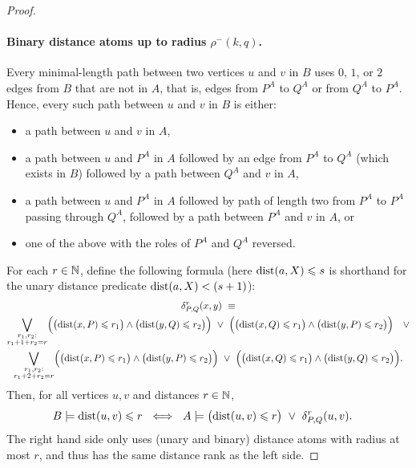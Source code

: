 \begin{proof}
    \paragraph{Binary distance atoms up to radius \(\rho^-(k,q)\).}

    Every minimal-length path between two vertices \(u\) and \(v\) in \(B\)
    uses $0$, $1$, or $2$ edges from \(B\) that are not in \(A\), that is, edges from \(P^A\) to \(Q^A\) or from \(Q^A\) to \(P^A\).
    Hence, every such path between \(u\) and \(v\) in \(B\)
    is either:
    \begin{itemize}
       \item  a path between \(u\) and \(v\) in \(A\),
       \item a path between \(u\) and \(P^A\) in \(A\) followed by an edge from \(P^A\) to \(Q^A\) (which exists in \(B\)) followed by a path between \(Q^A\) and \(v\) in \(A\),
       \item a path between \(u\) and $P^A$ in \(A\) followed by path of length two  from \(P^A\) to \(P^A\) passing through \(Q^A\), followed by a path between \(P^A\) and \(v\) in \(A\), or
       \item one of the above with the roles of \(P^A\) and \(Q^A\) reversed.
    \end{itemize}
For each $r\in \mathbb N$, define the following formula (here $\mathrm{dist}(a,X)\leqslant s$ is shorthand for the unary distance predicate $\mathrm{dist}(a,X)<(s+1)$):
\begin{multline*}
\delta^r_{P,Q}(x,y)\ \equiv\\
\bigvee_{\substack{r_1,r_2:\\r_1+1+r_2=r}} \Bigl(\bigl(\mathrm{dist}(x,P) \leqslant r_1\bigr) \land \bigl(\mathrm{dist}(y,Q) \leqslant r_2\bigr)\Bigr)\ \lor\
        \Bigl(\bigl(\mathrm{dist}(x,Q) \leqslant r_1\bigr) \land \bigl(\mathrm{dist}(y,P) \leqslant r_2\bigr)\Bigr)\quad\lor\\
        \bigvee_{\substack{r_1,r_2:\\r_1+2+r_2=r}} \Bigl(\bigl(\mathrm{dist}(x,P) \leqslant r_1\bigr) \land \bigl(\mathrm{dist}(y,P) \leqslant r_2\bigr)\Bigr)\ \lor\
        \Bigl(\bigl(\mathrm{dist}(x,Q) \leqslant r_1\bigr) \land \bigl(\mathrm{dist}(y,Q) \leqslant r_2\bigr)\Bigr).
\end{multline*}
Then, for all vertices \(u,v\) and distances \(r \in \mathbb N\),
    \begin{align}\label{eq:dist}
        &B\models \mathrm{dist}(u,v) \leqslant r ~\iff~ A\models \bigl(\mathrm{dist}(u,v) \leqslant r\bigr) \ \lor\   \delta^r_{P,Q}(u,v).
    \end{align}
    The right hand side only uses (unary and binary) distance atoms with radius at most \(r\), and thus has the same distance rank as the left side.


\end{proof}
